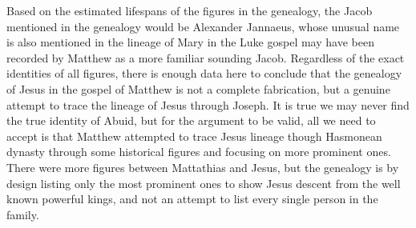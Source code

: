 Based on the estimated lifespans of the figures in the genealogy, the Jacob mentioned in the genealogy would be Alexander Jannaeus, whose unusual name is also mentioned in the lineage of Mary in the Luke gospel may have been recorded by Matthew as a more familiar sounding Jacob.
Regardless of the exact identities of all figures, there is enough data here to conclude that the genealogy of Jesus in the gospel of Matthew is not a complete fabrication, but a genuine attempt to trace the lineage of Jesus through Joseph.
It is true we may never find the true identity of Abuid, but for the argument to be valid, all we need to accept is that Matthew attempted to trace Jesus lineage though Hasmonean dynasty through some historical figures and focusing on more prominent ones.
There were more figures between Mattathias and Jesus, but the genealogy is by design listing only the most prominent ones to show Jesus descent from the well known powerful kings, and not an attempt to list every single person in the family.

